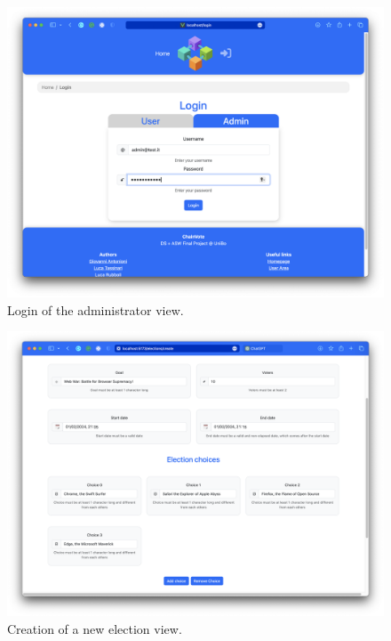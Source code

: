 \documentclass{scrartcl}
\begin{document}
\begin{figure}
    \centering
    \includegraphics[width=0.9\linewidth]{figures/story-board/2-login-admin.png}
    \caption{Login of the administrator view.}
    \label{fig:login-admin}
\end{figure}

\begin{figure}
    \centering
    \includegraphics[width=0.88\linewidth]{figures/story-board/3-creation-election.png}
    \caption{Creation of a new election view.}
    \label{fig:creation-election}
\end{figure}
\end{document}
